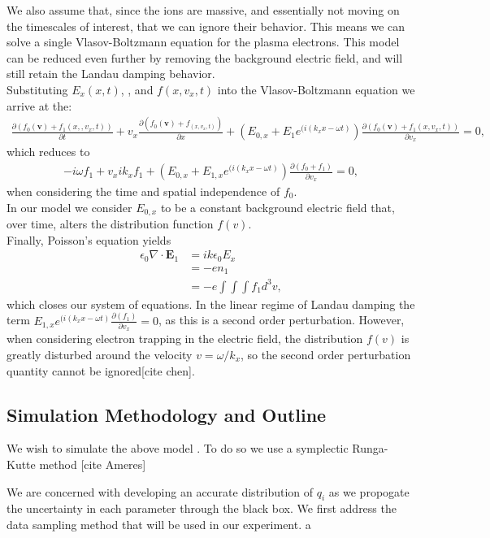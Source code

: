 \documentclass{article}
\begin{document}
 We also assume that, since the ions are massive, and essentially not moving on the timescales of interest, that we can ignore their behavior. This means we can solve a single Vlasov-Boltzmann equation for the plasma electrons. This model can be reduced even further by removing the background electric field, and will still retain the Landau damping behavior.\\
Substituting $E_x(x,t)$, , and $f(x,v_x,t)$ into the Vlasov-Boltzmann equation we arrive at the:
\begin{align*}
\frac{\partial(f_0(\textbf{v}) + f_1(x,,v_x,t))}{\partial t} +  v_{x}\frac{\partial( f_0(\textbf{v}) + f_(x,v_x,t))}{\partial x} + (E_{0,x} + E_1e^{(i(k_x x-\omega t)})\frac{\partial(f_0(\textbf{v}) + f_1(x,v_x,t))}{\partial v_x}=0,
\end{align*}
which reduces to
\begin{align*}
-i\omega f_1 +  v_{x}ik_xf_1 + (E_{0,x} + E_{1,x}e^{(i(k_x x-\omega t)})\frac{\partial( f_0 + f_1)}{\partial v_x} =0,
\end{align*}
when considering the time and spatial independence of $f_0$.\\
In our model we consider $E_{0,x}$ to be a constant background electric field that, over time, alters the distribution function $f(v)$.\\
Finally, Poisson's equation yields
\begin{align*}
\epsilon_{0} \nabla \cdot \textbf{E}_1 &= ik \epsilon_0E_x\\
& = -en_1\\
& = -e \int \int \int f_1 d^3 v,
\end{align*}
which closes our system of equations.
In the linear regime of Landau damping the term $E_{1,x}e^{(i(k_x x-\omega t)}\frac{\partial(  f_1)}{\partial v_x}=0$, as this is a second order perturbation. However, when considering electron trapping in the electric field, the distribution $f(v)$ is greatly disturbed around the velocity $v=\omega/k_x$, so the second order perturbation quantity cannot be ignored[cite chen].\\
\subsection{Simulation Methodology and Outline}
We wish to simulate the above model . To do so we use a symplectic Runga-Kutte method [cite Ameres]


We are concerned with developing an accurate distribution of $q_i$ as we propogate the uncertainty in each parameter through the black box. We first address the data sampling method that will be used in our experiment. a
\end{document}
